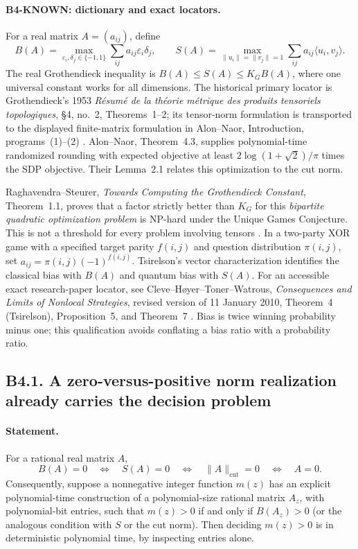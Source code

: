 \paragraph{B4-KNOWN: dictionary and exact locators.}
For a real matrix $A=(a_{ij})$, define
\[
 B(A)=\max_{\varepsilon_i,\delta_j\in\{-1,1\}}
          \sum_{ij}a_{ij}\varepsilon_i\delta_j,
 \qquad
 S(A)=\max_{\|u_i\|=\|v_j\|=1}
          \sum_{ij}a_{ij}\langle u_i,v_j\rangle.
\]
The real Grothendieck inequality is $B(A)\leq S(A)\leq K_GB(A)$,
where one universal constant works for all dimensions.  The historical
primary locator is Grothendieck's 1953 \emph{R\'esum\'e de la th\'eorie
m\'etrique des produits tensoriels topologiques}, \S4, no.~2,
Theorems~1--2; its tensor-norm formulation is transported to the displayed
finite-matrix formulation in Alon--Naor, Introduction, programs~(1)--(2)
\cite{groth1953,alon-naor2006}.  Alon--Naor, Theorem~4.3, supplies
polynomial-time randomized rounding with expected objective at least
$2\log(1+\sqrt2)/\pi$ times the SDP objective.  Their Lemma~2.1 relates this
optimization to the cut norm.

Raghavendra--Steurer, \emph{Towards Computing the Grothendieck Constant},
Theorem~1.1, proves that a factor strictly better than $K_G$ for this
\emph{bipartite quadratic optimization problem} is NP-hard under the
Unique Games Conjecture.  This is not a threshold for every problem
involving tensors \cite{rs2009}.  In a two-party XOR game with a specified
target parity $f(i,j)$ and question distribution $\pi(i,j)$, set
$a_{ij}=\pi(i,j)(-1)^{f(i,j)}$.  Tsirelson's vector characterization
identifies the classical bias with $B(A)$ and quantum bias with $S(A)$.
For an accessible exact research-paper locator, see Cleve--H\o yer--Toner--Watrous,
\emph{Consequences and Limits of Nonlocal Strategies}, revised version
of 11 January 2010, Theorem~4 (Tsirelson), Proposition~5, and Theorem~7
\cite{chtw2010}.  Bias is twice winning probability minus one; this
qualification avoids conflating a bias ratio with a probability ratio.

\subsection*{B4.1. A zero-versus-positive norm realization already carries the decision problem}
\paragraph{Statement.}
For a rational real matrix $A$,
\[
 B(A)=0\quad\Longleftrightarrow\quad S(A)=0
 \quad\Longleftrightarrow\quad \|A\|_{\mathrm{cut}}=0
 \quad\Longleftrightarrow\quad A=0.
\]
Consequently, suppose a nonnegative integer function $m(z)$ has an
explicit polynomial-time construction of a polynomial-size rational
matrix $A_z$, with polynomial-bit entries, such that
$m(z)>0$ if and only if $B(A_z)>0$ (or the analogous condition with
$S$ or the cut norm).  Then deciding $m(z)>0$ is in deterministic
polynomial time, by inspecting entries alone.
